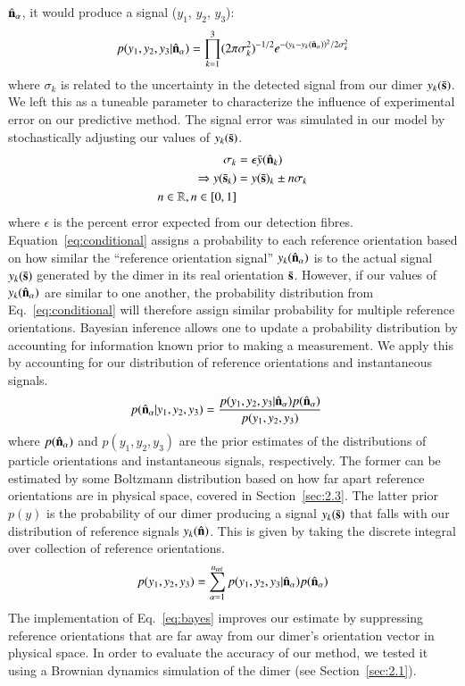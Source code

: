 \documentclass[final, 3p]{elsarticle}
\begin{document}
$\hat{\bf n}_\alpha$, it would produce a signal ($y_1$, $y_2$, $y_3$):
\begin{align}
\label{eq:conditional}
  p(y_1, y_2, y_3|\hat{\bf n}_\alpha)
  = \prod^3_{k=1}
(2\pi\sigma_k^2)^{-1/2} 
e^{-(y_{k}-y_{k}(\hat{\bf n}_\alpha))^2/2\sigma_k^2}
\end{align}
where $\sigma_k$ is related to the uncertainty in the detected signal
from our dimer $y_k(\bar{\bf s})$.  We left this as a tuneable
parameter to characterize the influence of experimental error on our
predictive method.  The signal error was simulated in our model by
stochastically adjusting our values of $y_k(\bar{\bf s})$.
\begin{eqnarray*}
  \sigma_k
  &= \epsilon\bar{y}(\hat{\bf n}_k)
  \\
  \Rightarrow y(\bar{\bf s}_k) &= y(\bar{\bf s})_k \pm n\sigma_k
  \\ 
n \in \mathbb{R}, n\in[0,1]
\end{eqnarray*} 
where $\epsilon$ is the percent error expected from our detection
fibres.  Equation~\eqref{eq:conditional} assigns a probability to each
reference orientation based on how similar the ``reference orientation
signal'' $y_{k}(\hat{\bf n}_\alpha)$ is to the actual signal
$y_{k}(\bar{\bf s})$ generated by the dimer in its real orientation
$\bar{\bf s}$.  However, if our values of $y_k(\hat{\bf n}_\alpha)$
are similar to one another, the probability distribution from
Eq.~\eqref{eq:conditional} will therefore assign similar probability
for multiple reference orientations.  Bayesian inference allows one to
update a probability distribution by accounting for information known
prior to making a measurement.  We apply this by accounting for our
distribution of reference orientations and instantaneous signals.
\begin{align}
  \label{eq:bayes}
  p(\hat{\bf n}_\alpha| y_1,y_2,y_3)
  &=
    \frac{p(y_1,y_2,y_3|\hat{\bf n}_\alpha)
    p(\hat{\bf n}_\alpha)}{p(y_1, y_2, y_3)}
\end{align}
where $p(\hat{\bf n}_\alpha)$ and $p(y_1, y_2, y_3)$ are the prior
estimates of the distributions of particle orientations and
instantaneous signals, respectively.  The former can be estimated by
some Boltzmann distribution based on how far apart reference
orientations are in physical space, covered in Section~\ref{sec:2.3}.
The latter prior $p(y)$ is the probability of our dimer producing a
signal $y_k(\bar{\bf s})$ that falls with our distribution of
reference signals $y_k(\hat{\bf n})$.  This is given by taking the
discrete integral over collection of reference orientations.
\begin{align}
  p(y_1, y_2, y_3)
  =
  \sum_{\alpha=1}^{n_{\rm ref}}
  p(y_1, y_2, y_3|\hat{\bf n}_\alpha)
  p(\hat{\bf n}_\alpha)
\end{align}
The implementation of Eq.~\eqref{eq:bayes} improves our estimate by
suppressing reference orientations that are far away from our dimer's
orientation vector in physical space.  In order to evaluate the
accuracy of our method, we tested it using a Brownian dynamics
simulation of the dimer (see Section~\ref{sec:2.1}).
\end{document}
